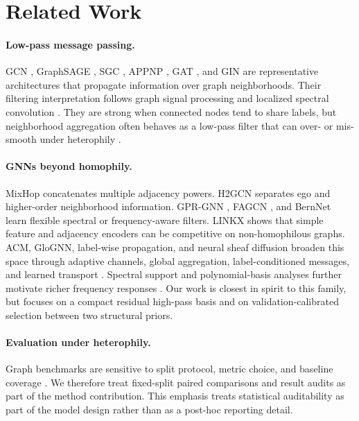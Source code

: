 \documentclass[letterpaper]{article} %
\begin{document}
\section{Related Work}

\paragraph{Low-pass message passing.}
GCN \cite{kipf2017semi}, GraphSAGE \cite{hamilton2017inductive}, SGC \cite{wu2019simplifying}, APPNP \cite{klicpera2019predict}, GAT \cite{velickovic2018graph}, and GIN \cite{xu2019powerful} are representative architectures that propagate information over graph neighborhoods.
Their filtering interpretation follows graph signal processing and localized spectral convolution \cite{hammond2011wavelets,shuman2013emerging,defferrard2016convolutional,ortega2018graph}.
They are strong when connected nodes tend to share labels, but neighborhood aggregation often behaves as a low-pass filter that can over- or mis-smooth under heterophily \cite{nt2019revisiting,li2018deeper,oono2020graph,rong2020dropedge,chen2020simple,yan2022two}.

\paragraph{GNNs beyond homophily.}
MixHop \cite{abu2019mixhop} concatenates multiple adjacency powers.
H2GCN \cite{zhu2020beyond} separates ego and higher-order neighborhood information.
GPR-GNN \cite{chien2021gprgnn}, FAGCN \cite{bo2021beyond}, and BernNet \cite{he2021bernnet} learn flexible spectral or frequency-aware filters.
LINKX \cite{lim2021large} shows that simple feature and adjacency encoders can be competitive on non-homophilous graphs.
ACM, GloGNN, label-wise propagation, and neural sheaf diffusion broaden this space through adaptive channels, global aggregation, label-conditioned messages, and learned transport \cite{luan2022revisiting,li2022global,dai2022labelwise,bodnar2022neural}.
Spectral support and polynomial-basis analyses further motivate richer frequency responses \cite{balcilar2021breaking,wang2022spectral}.
Our work is closest in spirit to this family, but focuses on a compact residual high-pass basis and on validation-calibrated selection between two structural priors.

\paragraph{Evaluation under heterophily.}
Graph benchmarks are sensitive to split protocol, metric choice, and baseline coverage \cite{shchur2018pitfalls,pei2020geomgcn,lim2021large,platonov2023critical}.
We therefore treat fixed-split paired comparisons and result audits as part of the method contribution.
This emphasis treats statistical auditability as part of the model design rather than as a post-hoc reporting detail.
\end{document}

